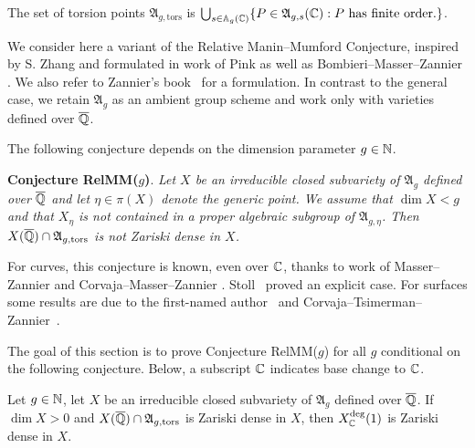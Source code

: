 \documentclass[12pt,oneside]{amsart}
\begin{document}
The set of torsion points  $\mathfrak{A}_{g,\mathrm{tors}}$ is
$\bigcup_{s\in {\mathbb{A}}_g({\mathbb{C}})}
\{ P \in \mathfrak{A}_{g,s}({\mathbb{C}}) : \text{$P$ has finite order}. \}$.


We consider here a variant of the Relative Manin--Mumford Conjecture,
inspired by S. Zhang \cite{zhang1998small} and formulated in work of
Pink \cite{Pink05} as well as Bombieri--Masser--Zannier
\cite{BMZGeometric}. We also refer to Zannier's
book~\cite{ZannierBook} for a formulation. In contrast to the general
case, we retain $\mathfrak{A}_g$ as an ambient group scheme and work
only with varieties defined over ${\overline{\mathbb{Q}}}$.

The following conjecture depends on the dimension parameter
$g\in{\mathbb{N}}$.

\medskip\noindent\textbf{Conjecture RelMM($g$)}.\textit{
  Let $X$ be an irreducible closed subvariety of $\mathfrak{A}_g$
  defined over ${\overline{\mathbb{Q}}}$ and
  let $\eta\in \pi(X)$ denote the generic point. 
  We assume that $\dim X < g$ and that $X_\eta$ is not contained in a
  proper algebraic subgroup of $\mathfrak{A}_{g,\eta}$. Then
  $X({\overline{\mathbb{Q}}})\cap \mathfrak{A}_{g,\mathrm{tors}}$ is not Zariski dense in $X$.}
\medskip

For curves, this conjecture is known, even over ${\mathbb{C}}$, thanks to work
of Masser--Zannier and Corvaja--Masser--Zannier
\cite{MZ:torsionanomalous,MasserZannierTorsionPointOnSqEC,
MASSER2014116, MasserZannierRelMMSimpleSur, CorvajaMasserZannier2018,
MasserZannierRMMoverCurve}. Stoll~\cite{Stoll:simtorsion} proved an
explicit case. For surfaces some results are due to the first-named
author~\cite{hab:weierstrass} and
Corvaja--Tsimerman--Zannier~\cite{CTZ:23}.

The goal of this section is to prove Conjecture RelMM($g$) for all $g$
conditional on the following conjecture. Below, a subscript ${\mathbb{C}}$ indicates
base change to ${\mathbb{C}}$.



\begin{conjecture}
  \label{conj:relmmXdeg1dense}
  Let $g\in{\mathbb{N}}$, let
  $X$ be an irreducible closed subvariety of $\mathfrak{A}_g$
  defined over ${\overline{\mathbb{Q}}}$. %
  If $\dim X>0$ and 
  $X({\overline{\mathbb{Q}}})\cap \mathfrak{A}_{g,\mathrm{tors}}$ is  Zariski dense in
  $X$, then $X_{\mathbb{C}}^{\mathrm{deg}}(1)$ is Zariski dense in $X$.
\end{conjecture}
\end{document}
